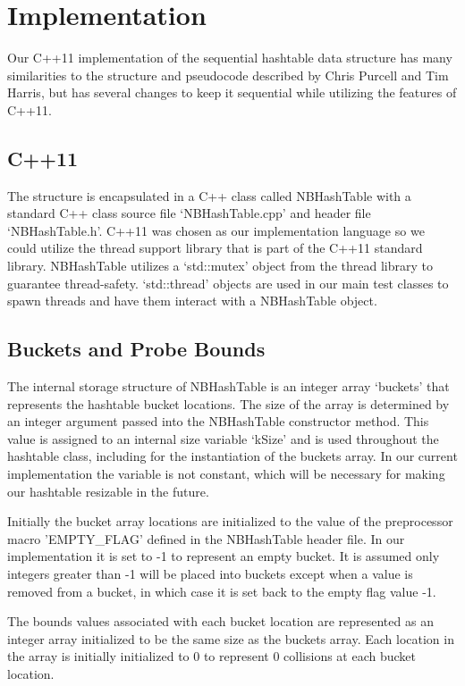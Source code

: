 \documentclass[journal]{IEEEtran}
\begin{document}
\section{Implementation}

Our C++11 implementation of the sequential hashtable data structure has many similarities to the structure and pseudocode described by Chris Purcell and Tim Harris, but has several changes to keep it sequential while utilizing the features of C++11.

\subsection{C++11}
The structure is encapsulated in a C++ class called NBHashTable with a standard C++ class source file ‘NBHashTable.cpp’ and header file ‘NBHashTable.h’. C++11 was chosen as our implementation language so we could utilize the thread support library that is part of the C++11 standard library. NBHashTable utilizes a ‘std::mutex’ object from the thread library to guarantee thread-safety. ‘std::thread’ objects are used in our main test classes to spawn threads and have them interact with a NBHashTable object.

\subsection{Buckets and Probe Bounds}
The internal storage structure of NBHashTable is an integer array ‘buckets’ that represents the hashtable bucket locations. The size of the array is determined by an integer argument passed into the NBHashTable constructor method. This value is assigned to an internal size variable ‘kSize’ and is used throughout the hashtable class, including for the instantiation of the buckets array. In our current implementation the variable is not constant, which will be necessary for making our hashtable resizable in the future.

Initially the bucket array locations are initialized to the value of the preprocessor macro 'EMPTY\_FLAG' defined in the NBHashTable header file. In our implementation it is set to -1 to represent an empty bucket. It is assumed only integers greater than -1 will be placed into buckets except when a value is removed from a bucket, in which case it is set back to the empty flag value -1.

The bounds values associated with each bucket location are represented as an integer array initialized to be the same size as the buckets array. Each location in the array is initially initialized to 0 to represent 0 collisions at each bucket location.
\end{document}
